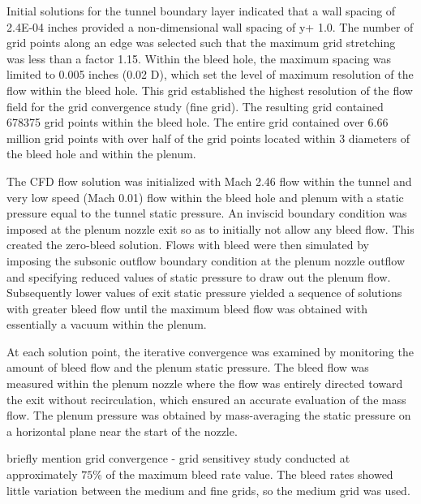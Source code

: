 Initial solutions for the tunnel boundary layer indicated that a wall spacing of 2.4E-04 inches provided a non-dimensional wall spacing of y+  1.0. The number of grid points along an edge was selected such that the maximum grid stretching was less than a factor 1.15. Within the bleed hole, the maximum spacing was limited to 0.005 inches (0.02 D), which set the level of maximum resolution of the flow within the bleed hole. This grid established the highest resolution of the flow field for the grid convergence study (fine grid). The resulting grid contained 678375 grid points within the bleed hole. The entire grid contained over 6.66 million grid points with over half of the grid points located within 3 diameters of the bleed hole and within the plenum. 

The CFD flow solution was initialized with Mach 2.46 flow within the tunnel and very low speed (Mach 0.01) flow within the bleed hole and plenum with a static pressure equal to the tunnel static pressure. An inviscid boundary condition was imposed at the plenum nozzle exit so as to initially not allow any bleed flow. This created the zero-bleed solution. Flows with bleed were then simulated by imposing the subsonic outflow boundary condition at the plenum nozzle outflow and specifying reduced values of static pressure to draw out the plenum flow. Subsequently lower values of exit static pressure yielded a sequence of solutions with greater bleed flow until the maximum bleed flow was obtained with essentially a vacuum within the plenum. 

At each solution point, the iterative convergence was examined by monitoring the amount of bleed flow and the plenum static pressure. The bleed flow was measured within the plenum nozzle where the flow was entirely directed toward the exit without recirculation, which ensured an accurate evaluation of the mass flow. The plenum pressure was obtained by mass-averaging the static pressure on a horizontal plane near the start of the nozzle. 

briefly mention grid convergence - grid sensitivey study conducted at approximately $75\%$ of the maximum bleed rate value. The bleed rates showed little variation between the medium and fine grids, so the medium grid was used.

